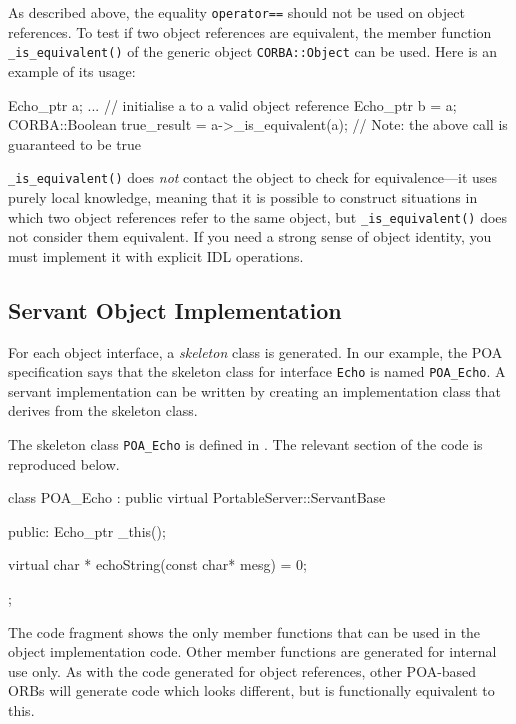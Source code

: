 \documentclass[11pt,twoside,a4paper]{book}
\newcommand{\type}[1]{\texttt{#1}}
\newcommand{\intf}[1]{\texttt{#1}}
\newcommand{\code}[1]{\texttt{#1}}
\newcommand{\op}[1]{\texttt{#1()}}
\newcommand{\term}[1]{\textit{#1}}
\newcommand{\file}{\begingroup \urlstyle{tt}\Url}
\begin{document}
As described above, the equality \code{operator==} should not be used
on object references. To test if two object references are equivalent,
the member function \op{\_is\_equivalent} of the generic object
\type{CORBA::Object} can be used. Here is an example of its usage:

\begin{cxxlisting}
Echo_ptr a;
...            // initialise a to a valid object reference 
Echo_ptr b = a;
CORBA::Boolean true_result = a->_is_equivalent(a); 
// Note: the above call is guaranteed to be true
\end{cxxlisting}

\op{\_is\_equivalent} does \emph{not} contact the object to check for
equivalence---it uses purely local knowledge, meaning that it is
possible to construct situations in which two object references refer
to the same object, but \op{\_is\_equivalent} does not consider them
equivalent. If you need a strong sense of object identity, you must
implement it with explicit IDL operations.


\subsection{Servant Object Implementation}
\label{stubobjimpl}

For each object interface, a \term{skeleton} class is generated.  In
our example, the POA specification says that the skeleton class for
interface \intf{Echo} is named \type{POA\_Echo}. A servant
implementation can be written by creating an implementation class that
derives from the skeleton class.

The skeleton class \type{POA\_Echo} is defined in \file{echo.hh}. The
relevant section of the code is reproduced below.

\begin{cxxlisting}
class POA_Echo :
  public virtual PortableServer::ServantBase
{
public:
  Echo_ptr _this();

  virtual char * echoString(const char* mesg) = 0;
};
\end{cxxlisting}

The code fragment shows the only member functions that can be used in
the object implementation code. Other member functions are generated
for internal use only. As with the code generated for object
references, other POA-based ORBs will generate code which looks
different, but is functionally equivalent to this.
\end{document}
